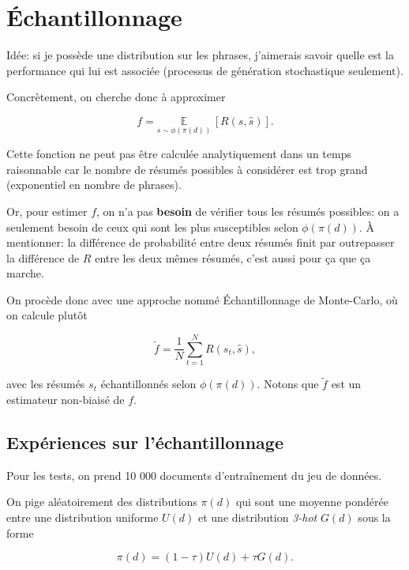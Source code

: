 \chapter{Échantillonnage}
\label{chap:mcs}                   %

Idée: si je possède une distribution sur les phrases, j'aimerais savoir
quelle est la performance qui lui est associée (processus de génération
stochastique seulement).

Concrètement, on cherche donc à approximer

\begin{equation}
    f = \underset{{s \sim \phi(\pi(d))}}{\mathbb{E}} \,\left[R(s, \hat{s})\right].
\end{equation}

Cette fonction ne peut pas être calculée analytiquement dans un temps
raisonnable car le nombre de résumés possibles à considérer est trop grand
(exponentiel en nombre de phrases).

Or, pour estimer $f$, on n'a pas \textbf{besoin} de vérifier tous les résumés
possibles: on a seulement besoin de ceux qui sont les plus susceptibles selon
$\phi(\pi(d))$.
À mentionner: la différence de probabilité entre deux résumés finit par outrepasser
la différence de $R$ entre les deux mêmes résumés, c'est aussi pour ça que ça marche.

On procède donc avec une approche nommé Échantillonnage de Monte-Carlo, où on
calcule plutôt

\begin{equation}
    \tilde{f} = \frac{1}{N} \sum_{t=1}^N R(s_t, \hat{s}),
\end{equation}

avec les résumés $s_t$ échantillonnés selon $\phi(\pi(d))$. Notons que $\tilde{f}$
est un estimateur non-biaisé de $f$.

\section{Expériences sur l'échantillonnage}

Pour les tests, on prend 10 000 documents d'entraînement du jeu de données.

On pige aléatoirement des distributions $\pi(d)$ qui sont une moyenne pondérée
entre une distribution uniforme $U(d)$ et une distribution \textit{3-hot} $G(d)$
sous la forme

\begin{equation}
    \pi(d) = (1 - \tau) U(d) + \tau G(d).
\end{equation}

